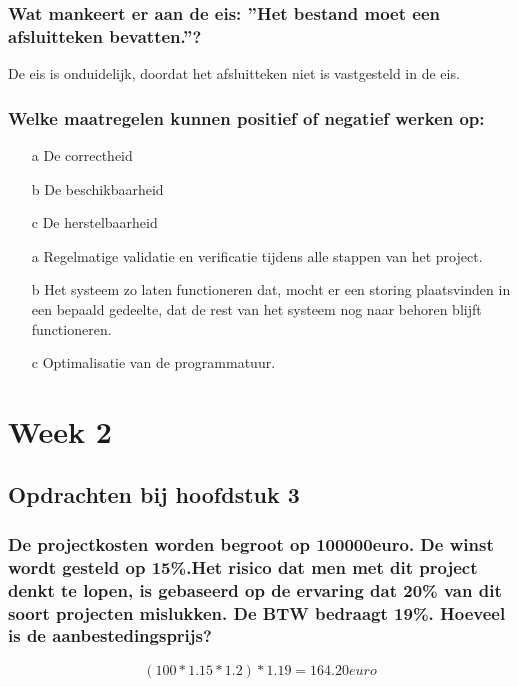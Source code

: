 \documentclass[a4paper,titlepage]{artikel1}
\begin{document}
   
   \subsubsection[Opdracht 9]{Wat mankeert er aan de eis: ''Het bestand moet een afsluitteken bevatten.''?}
   De eis is onduidelijk, doordat het afsluitteken niet is vastgesteld in de eis. 
   
   \subsubsection[Opdracht 10]{Welke maatregelen kunnen positief of negatief werken op:}
   \begin{itemize}
    \item[a] De correctheid
    \item[b] De beschikbaarheid
    \item[c] De herstelbaarheid
   \end{itemize}
   \begin{itemize}
     \item[a] Regelmatige validatie en verificatie tijdens alle stappen van het project.
     \item[b] Het systeem zo laten functioneren dat, mocht er een storing plaatsvinden in een bepaald gedeelte, dat de rest van het systeem nog naar behoren blijft functioneren.
     \item[c] Optimalisatie van de programmatuur.
   \end{itemize}
   
 \section{Week 2}
  \subsection{Opdrachten bij hoofdstuk 3}
   \subsubsection[Opdracht 1]{De projectkosten worden begroot op
   100000euro. De winst wordt gesteld op 15\%.Het risico dat men met dit
   project denkt te lopen, is gebaseerd op de ervaring dat 20\% van dit
   soort projecten mislukken. De BTW bedraagt 19\%. Hoeveel is de
   aanbestedingsprijs?}
   \begin{displaymath}
    (100*1.15*1.2)*1.19={164.20}euro
   \end{displaymath}
   
\end{document}
